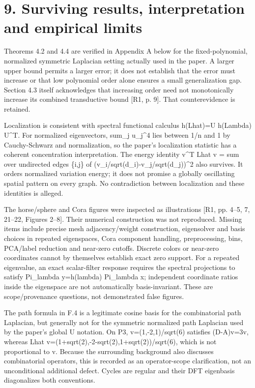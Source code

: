 \documentclass[10pt]{article}
\begin{document}
\section*{9. Surviving results, interpretation and empirical limits}
Theorems 4.2 and 4.4 are verified in Appendix A below for the fixed-polynomial, normalized symmetric Laplacian setting actually used in the paper. A larger upper bound permits a larger error; it does not establish that the error must increase or that low polynomial order alone ensures a small generalization gap. Section 4.3 itself acknowledges that increasing order need not monotonically increase its combined transductive bound [R1, p. 9]. That counterevidence is retained.\par
Localization is consistent with spectral functional calculus h(Lhat)=U h(Lambda) U\textasciicircum{}T. For normalized eigenvectors, sum\_j u\_j\textasciicircum{}4 lies between 1/n and 1 by Cauchy-Schwarz and normalization, so the paper’s localization statistic has a coherent concentration interpretation. The energy identity v\textasciicircum{}T Lhat v = sum over undirected edges \{i,j\} of (v\_i/sqrt(d\_i)-v\_j/sqrt(d\_j))\textasciicircum{}2 also survives. It orders normalized variation energy; it does not promise a globally oscillating spatial pattern on every graph. No contradiction between localization and these identities is alleged.\par
The horse/sphere and Cora figures were inspected as illustrations [R1, pp. 4–5, 7, 21–22, Figures 2–8]. Their numerical construction was not reproduced. Missing items include precise mesh adjacency/weight construction, eigensolver and basis choices in repeated eigenspaces, Cora component handling, preprocessing, bins, PCA/label reduction and near-zero cutoffs. Discrete colors or near-zero coordinates cannot by themselves establish exact zero support. For a repeated eigenvalue, an exact scalar-filter response requires the spectral projections to satisfy Pi\_lambda y=h(lambda) Pi\_lambda x; independent coordinate ratios inside the eigenspace are not automatically basis-invariant. These are scope/provenance questions, not demonstrated false figures.\par
The path formula in F.4 is a legitimate cosine basis for the combinatorial path Laplacian, but generally not for the symmetric normalized path Laplacian used by the paper’s global U notation. On P3, v=(1,-2,1)/sqrt(6) satisfies (D-A)v=3v, whereas Lhat v=(1+sqrt(2),-2-sqrt(2),1+sqrt(2))/sqrt(6), which is not proportional to v. Because the surrounding background also discusses combinatorial operators, this is recorded as an operator-scope clarification, not an unconditional additional defect. Cycles are regular and their DFT eigenbasis diagonalizes both conventions.\par
\end{document}

